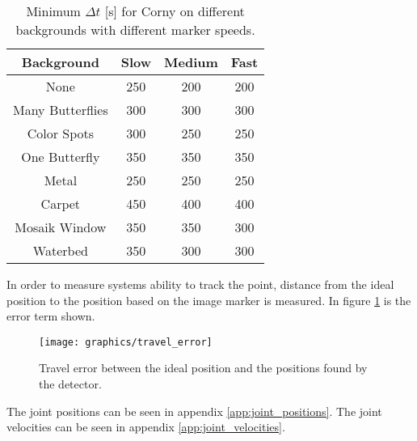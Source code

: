 
\begin{table}[H]
\center
\begin{tabular}{|c|c|c|c|}
\hline
Background       & Slow & Medium & Fast \\ \hline
None             & 250  & 200    & 200\\ \hline 
Many Butterflies & 300  & 300    & 300\\ \hline 
Color Spots      & 300  & 250    & 250\\ \hline 
One Butterfly    & 350  & 350    & 350\\ \hline 
Metal            & 250  & 250    & 250\\ \hline 
Carpet           & 450  & 400    & 400\\ \hline 
Mosaik Window    & 350  & 350    & 300\\ \hline 
Waterbed         & 350  & 300    & 300\\ \hline 
\end{tabular}
\caption{Minimum $\Delta t$ [s] for Corny on different backgrounds with different marker speeds.}
\label{tb:min_dt_corny}
\end{table}

In order to measure systems ability to track the point, distance from the ideal position to the position based on the image marker is measured.
In figure \ref{fig:travel_error} is the error term shown.

\begin{figure}
 \centering
 \texttt{[image: graphics/travel\_error]} %
 \caption{Travel error between the ideal position and the positions found by the detector.}
 \label{fig:travel_error}
\end{figure}

The joint positions can be seen in appendix \ref{app:joint_positions}.
The joint velocities can be seen in appendix \ref{app:joint_velocities}.